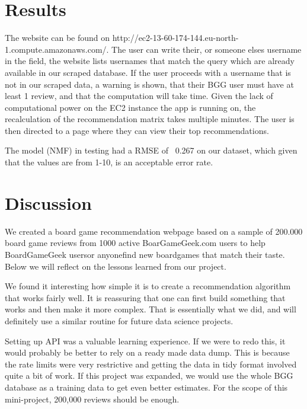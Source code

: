 \documentclass[a4paper,12pt,bibliography=totoc,numbers=noenddot,sfdefaults=false,abstract=true,notitlepage]{scrartcl} %
\begin{document}
	
	
	\section{Results}\label{results}
	
	
	The website can be found on http://ec2-13-60-174-144.eu-north-1.compute.amazonaws.com/. The user can write their, or someone elses username in the field, the
    website lists usernames that match the query which are already available in our scraped database. If the user proceeds with a username that is not in our scraped
    data, a warning is shown, that their BGG user must have at least 1 review, and that the computation will take time. Given the lack of computational power on the EC2
    instance the app is running on, the recalculation of the recommendation matrix takes multiple minutes. The user is then directed to a page where they can view their
    top recommendations.

    The model (NMF) in testing had a RMSE of ~0.267 on our dataset, which given that the values are from 1-10, is an acceptable error rate.
	
	
	
	
	
	\section{Discussion}\label{discussion}

	We created a board game recommendation webpage based on a sample of 200.000 board game reviews from 1000 active BoarGameGeek.com users to help BoardGameGeek users\textemdash or anyone\textemdash find new boardgames that match their taste. Below we will reflect on the lessons learned from our project.
	
	We found it interesting how simple it is to create a recommendation algorithm that works fairly well. It is reassuring that one can first build something that works and then make it more complex. That is essentially what we did, and will definitely use a similar routine for future data science projects.
	
	
	Setting up API was a valuable learning experience. If we were to redo this, it would probably be better to rely on a ready made data dump. This is because the rate limits were very restrictive and getting the data in tidy format involved quite a bit of work. If this project was expanded, we would use the whole BGG database as a training data to get even better estimates. For the scope of this mini-project, 200,000 reviews should be enough.
\end{document}

